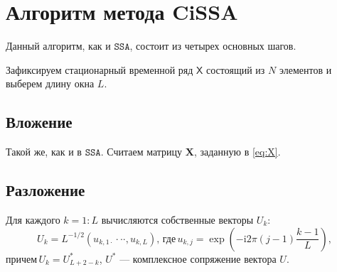 \documentclass[12pt, specialist, subf
]{disser}
\theoremstyle{definition}
\newcommand{\SSA}{\texttt{SSA}}
\newcommand{\TS}{\mathsf{X}}
\newtheorem{definition}{Определение} %
\begin{document}

\section{Алгоритм метода CiSSA}

Данный алгоритм, как и $\SSA$, состоит из четырех основных шагов.

Зафиксируем стационарный временной ряд $\TS$ состоящий из $N$ элементов и выберем длину окна $L$.
\subsection*{Вложение}
Такой же, как и в $\SSA$. Считаем матрицу $\mathbf{X}$, заданную в \eqref{eq:X}.

\subsection*{Разложение}

Для каждого $k = 1:L$ вычисляются собственные векторы ${U}_{k}$:
\begin{equation}
	\label{eq:U_k}
	{U}_{k}=L^{-1/2}(u_{k,1\cdot}\cdot\cdot\cdot,u_{k,L}), \, \text{где} \,
	u_{k,j}=\exp\left(-\mathrm{i}2\pi(j-1)\frac{k-1}{L}\right),
\end{equation}
$\text{причем} \, U_{k} = U_{L+2-k}^*$,  $U^*$ --- комплексное сопряжение вектора $U$.
\end{document}
